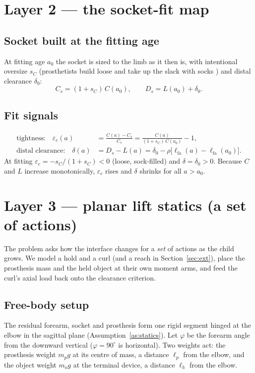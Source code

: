 \documentclass[11pt]{article}
\newcommand{\eps}{\varepsilon}
\newcommand{\lfa}{\ell_{\mathrm{fa}}}
\theoremstyle{definition}
\begin{document}
\section{Layer 2 --- the socket-fit map}

\subsection{Socket built at the fitting age}
At fitting age $a_0$ the socket is sized to the limb as it then is, with intentional oversize $s_C$ (prosthetists build loose and take up the slack with socks \cite{ghidini2025}) and distal clearance $\delta_0$:
\begin{equation}
C_s=(1+s_C)\,C(a_0),
\qquad
D_s=L(a_0)+\delta_0 .
\label{eq:socket}
\end{equation}

\subsection{Fit signals}
\begin{align}
\text{tightness:}\quad
\eps_c(a)&=\frac{C(a)-C_s}{C_s}
=\frac{C(a)}{(1+s_C)\,C(a_0)}-1,
\label{eq:epsc}\\[4pt]
\text{distal clearance:}\quad
\delta(a)&=D_s-L(a)=\delta_0-\rho\big[\lfa(a)-\lfa(a_0)\big].
\label{eq:delta}
\end{align}
At fitting $\eps_c=-s_C/(1+s_C)<0$ (loose, sock-filled) and $\delta=\delta_0>0$. Because $C$ and $L$ increase monotonically, $\eps_c$ rises and $\delta$ shrinks for all $a>a_0$.

\section{Layer 3 --- planar lift statics (a set of actions)}
\label{sec:lift}
The problem asks how the interface changes for a \emph{set} of actions as the child grows. We model a hold and a curl (and a reach in Section~\ref{sec:ext}), place the prosthesis mass and the held object at their own moment arms, and feed the curl's axial load back onto the clearance criterion.

\subsection{Free-body setup}
The residual forearm, socket and prosthesis form one rigid segment hinged at the elbow in the sagittal plane (Assumption~\ref{as:statics}). Let $\varphi$ be the forearm angle from the downward vertical ($\varphi=90^\circ$ is horizontal). Two weights act: the prosthesis weight $m_p g$ at its centre of mass, a distance $\ell_p$ from the elbow, and the object weight $m_o g$ at the terminal device, a distance $\ell_h$ from the elbow.
\end{document}
